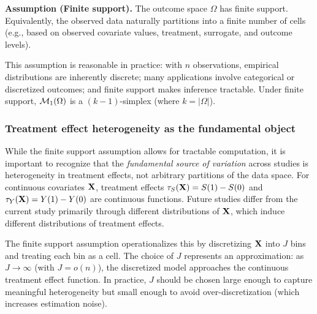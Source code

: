 \documentclass{article}
\newcommand{\PP}{\mathbb{P}}
\begin{document}
%
%

\noindent\textbf{Assumption (Finite support).}\label{ass:finite}
The outcome space $\Omega$ has finite support. Equivalently, the observed data naturally partitions into a finite number of cells (e.g., based on observed covariate values, treatment, surrogate, and outcome levels).

This assumption is reasonable in practice: with $n$ observations, empirical distributions are inherently discrete; many applications involve categorical or discretized outcomes; and finite support makes inference tractable. Under finite support, $\mathcal{M}_1(\Omega)$ is a $(k-1)$-simplex (where $k = |\Omega|$).

\subsubsection{Treatment effect heterogeneity as the fundamental object}

While the finite support assumption allows for tractable computation, it is important to recognize that the \emph{fundamental source of variation} across studies is heterogeneity in treatment effects, not arbitrary partitions of the data space. For continuous covariates $\mathbf{X}$, treatment effects $\tau_S(\mathbf{X}) = S(1) - S(0)$ and $\tau_Y(\mathbf{X}) = Y(1) - Y(0)$ are continuous functions. Future studies differ from the current study primarily through different distributions of $\mathbf{X}$, which induce different distributions of treatment effects.

The finite support assumption operationalizes this by discretizing $\mathbf{X}$ into $J$ bins and treating each bin as a cell. The choice of $J$ represents an approximation: as $J \to \infty$ (with $J = o(n)$), the discretized model approaches the continuous treatment effect function. In practice, $J$ should be chosen large enough to capture meaningful heterogeneity but small enough to avoid over-discretization (which increases estimation noise).
\end{document}

